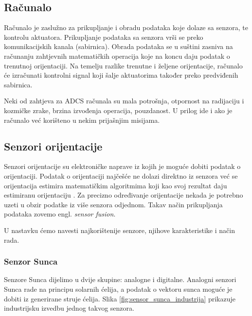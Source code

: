 \documentclass[times, utf8, diplomski, numeric]{templates/template}
\begin{document}
{{        \subsection{Računalo}{
            Računalo je zaslužno za prikupljanje i obradu podataka koje dolaze sa senzora, te kontrolu aktuatora. Prikupljanje podataka sa senzora vrši se preko komunikacijskih kanala (sabirnica). Obrada podataka se u suštini zasniva na računanju zahtjevnih matematičkih operacija koje na koncu daju podatak o trenutnoj orijentaciji. Na temelju razlike trenutne i željene orijentacije, računalo će izračunati kontrolni signal koji šalje aktuatorima također preko predviđenih sabirnica. 

            Neki od zahtjeva za ADCS računala su mala potrošnja, otpornost na radijaciju i kozmičke zrake, brzina izvođenja operacija, pouzdanost. U prilog ide i ako je računalo već korišteno u nekim prijašnjim misijama.
        }

        \subsection{Senzori orijentacije}{
            Senzori orijentacije su elektroničke naprave iz kojih je moguće dobiti podatak o orijentaciji. Podatak o orijentaciji najčešće ne dolazi direktno iz senzora već se orijentacija estimira matematičkim algoritmima koji kao svoj rezultat daju estimiranu orijentaciju \cite{adcsKnjiga}. Za precizno određivanje orijentacije nekada je potrebno uzeti u obzir podatke iz više senzora odjednom. Takav način prikupljanja podataka zovemo engl. \emph{sensor fusion}. 

            U nastavku ćemo navesti najkorištenije senzore, njihove karakteristike i način rada.

            \subsubsection{Senzor Sunca}{
                Senzore Sunca dijelimo u dvije skupine: analogne i digitalne. Analogni senzori Sunca rade na principu solarnih ćelija, a podatak o vektoru sunca moguće je dobiti iz generirane struje ćelija. Slika \ref{fig:sensor_sunca_industrija} prikazuje industrijsku izvedbu jednog takvog senzora.

}}}}
\end{document}
